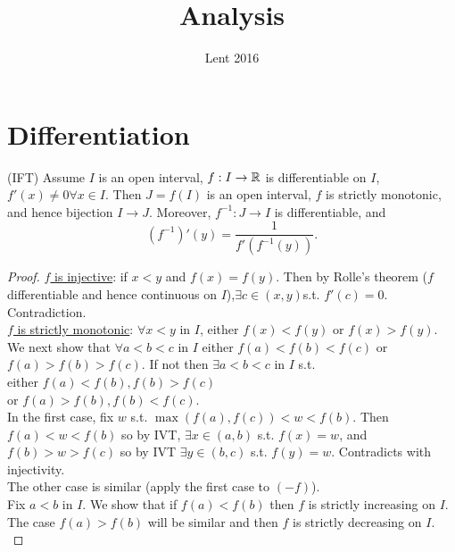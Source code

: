 \documentclass[a4paper]{article}
\begin{document}
\title{Analysis}
\date{Lent 2016}

\maketitle

\newpage

\tableofcontents

\newpage

\section{Differentiation}
\begin{thm}(IFT)
Assume $I$ is an open interval, $f:I\to \mathbb{R}$ is differentiable on $I$, $f'\left(x\right)\neq 0 \forall x\in I$. Then $J=f\left(I\right)$ is an open interval, $f$ is strictly monotonic, and hence bijection $I\to J$. Moreover, $f^{-1}:J\to I$ is differentiable, and
\begin{equation*}
\left(f^{-1}\right)'\left(y\right)=\frac{1}{f'\left(f^{-1}\left(y\right)\right)}.
\end{equation*}
\begin{proof}
\underline{$f$ is injective}: if $x<y$ and $f\left(x\right)=f\left(y\right)$. Then by Rolle's theorem ($f$ differentiable and hence continuous on $I$),$\exists c\in \left(x,y\right)$s.t. $f'\left(c\right)=0$. Contradiction.\\
\underline{$f$ is strictly monotonic}: $\forall x<y$ in $I$, either $f\left(x\right)<f\left(y\right)$ or $f\left(x\right)>f\left(y\right)$. We next show that $\forall a<b<c$ in $I$ either $f\left(a\right)<f\left(b\right)<f\left(c\right)$ or $f\left(a\right)>f\left(b\right)>f\left(c\right)$. If not then $\exists a<b<c$ in $I$ s.t.\\
either $f\left(a\right)<f\left(b\right), f\left(b\right)>f\left(c\right)$\\
or $f\left(a\right)>f\left(b\right), f\left(b\right)<f\left(c\right)$.\\
In the first case, fix $w$ s.t. $\max\left(f\left(a\right),f\left(c\right)\right)<w<f\left(b\right)$. Then $f\left(a\right)<w<f\left(b\right)$ so by IVT, $\exists x\in \left(a,b\right)$ s.t. $f\left(x\right)=w$, and $f\left(b\right)>w>f\left(c\right)$ so by IVT $\exists y\in \left(b,c\right)$ s.t. $f\left(y\right)=w$. Contradicts with injectivity.\\
The other case is similar (apply the first case to $\left(-f\right)$).\\
Fix $a<b$ in $I$. We show that if $f\left(a\right)<f\left(b\right)$ then $f$ is strictly increasing on $I$. The case $f\left(a\right)>f\left(b\right)$ will be similar and then $f$ is strictly decreasing on $I$.\\

\end{proof}
\end{thm}
\end{document}
